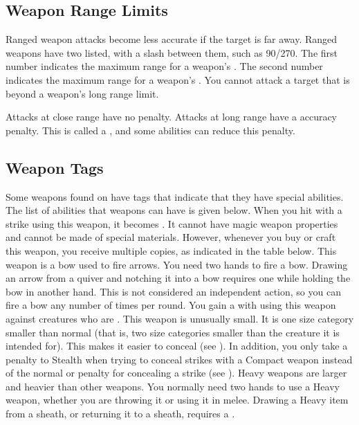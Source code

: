   \subsection{Weapon Range Limits}\label{Weapon Range Limits}
    Ranged weapon attacks become less accurate if the target is far away.
    Ranged weapons have two  listed, with a slash between them, such as 90/270.
    The first number indicates the maximum range for a weapon's .
    The second number indicates the maximum range for a weapon's .
    You cannot attack a target that is beyond a weapon's long range limit.

    Attacks at close range have no penalty.
    Attacks at long range have a  accuracy penalty.
    This is called a , and some abilities can reduce this penalty.

  \subsection{Weapon Tags}\label{Weapon Tags}
    Some weapons found on  have tags that indicate that they have special abilities. The list of abilities that weapons can have is given below.
     When you hit with a strike using this weapon, it becomes .
    It cannot have magic weapon properties and cannot be made of special materials.
    However, whenever you buy or craft this weapon, you receive multiple copies, as indicated in the table below.
     This weapon is a bow used to fire arrows.
    You need two hands to fire a bow.
    Drawing an arrow from a quiver and notching it into a bow requires one  while holding the bow in another hand.
    This is not considered an independent action, so you can fire a bow any number of times per round.
     You gain a   with   using this weapon against creatures who are \grappled.
     This weapon is unusually small.
    It is one size category smaller than normal (that is, two size categories smaller than the creature it is intended for).
    This makes it easier to conceal (see ).
    In addition, you only take a  penalty to Stealth when trying to conceal strikes with a Compact weapon instead of the normal  or  penalty for concealing a strike (see ).
     Heavy weapons are larger and heavier than other weapons.
    You normally need two hands to use a Heavy weapon, whether you are throwing it or using it in melee.
    Drawing a Heavy item from a sheath, or returning it to a sheath, requires a .

